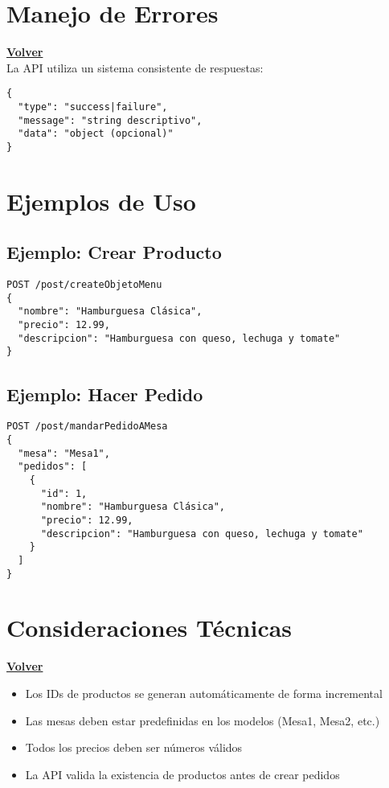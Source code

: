 \documentclass[12pt]{article}
\begin{document}
\clearpage

\section{Manejo de Errores}
\hyperlink{anchor-indice}{\textbf{Volver}}\\

La API utiliza un sistema consistente de respuestas:

\begin{verbatim}
{
  "type": "success|failure",
  "message": "string descriptivo",
  "data": "object (opcional)"
}
\end{verbatim}

\section{Ejemplos de Uso}

\subsection{Ejemplo: Crear Producto}
\begin{verbatim}
POST /post/createObjetoMenu
{
  "nombre": "Hamburguesa Clásica",
  "precio": 12.99,
  "descripcion": "Hamburguesa con queso, lechuga y tomate"
}
\end{verbatim}

\subsection{Ejemplo: Hacer Pedido}
\begin{verbatim}
POST /post/mandarPedidoAMesa
{
  "mesa": "Mesa1",
  "pedidos": [
    {
      "id": 1,
      "nombre": "Hamburguesa Clásica",
      "precio": 12.99,
      "descripcion": "Hamburguesa con queso, lechuga y tomate"
    }
  ]
}
\end{verbatim}

\clearpage

\section{Consideraciones Técnicas}
\hyperlink{anchor-indice}{\textbf{Volver}}\\

\begin{itemize}
    \item Los IDs de productos se generan automáticamente de forma incremental
    \item Las mesas deben estar predefinidas en los modelos (Mesa1, Mesa2, etc.)
    \item Todos los precios deben ser números válidos
    \item La API valida la existencia de productos antes de crear pedidos
\end{itemize}
\end{document}
